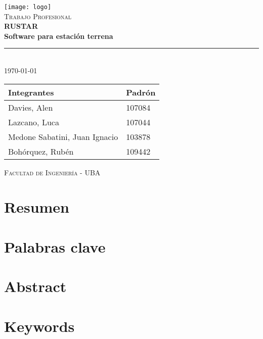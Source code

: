 \documentclass[a4paper,11pt]{article}
\begin{document}
\begin{titlepage}
\begin{center}

\texttt{[image: logo]} \\[2cm]

\textsc{\Large Trabajo Profesional} \\[0.5cm]
{\huge \bfseries RUSTAR \\[0.3cm]
Software para estación terrena} \\[1cm]

\rule{\linewidth}{0.4pt} \\[1cm]

{\large \today} \\[2cm]

\hspace*{-1.5cm}
\begin{tabular}{ | l | l | }
  \hline
  \textbf{Integrantes} & \textbf{Padrón} \\ \hline
  Davies, Alen & 107084 \\ \hline
  Lazcano, Luca & 107044 \\ \hline
  Medone Sabatini, Juan Ignacio & 103878 \\ \hline
  Bohórquez, Rubén & 109442 \\ \hline
\end{tabular}

\vfill

\textsc{Facultad de Ingeniería - UBA}

\end{center}
\end{titlepage}

\tableofcontents
\newpage

\section{Resumen}

\section{Palabras clave}

\section{Abstract}

\section{Keywords}
\end{document}
